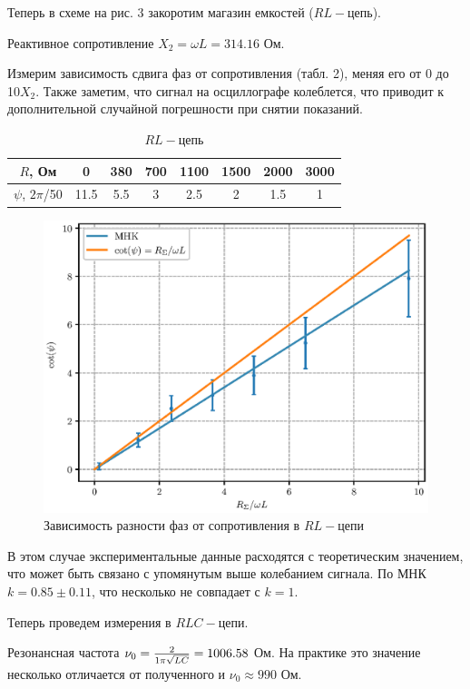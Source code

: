 \documentclass[12pt,a4paper]{article}
\begin{document}
Теперь в схеме на рис. 3 закоротим магазин емкостей ($RL-$цепь).

Реактивное сопротивление $X_2 = \omega L = 314.16$ Ом.

Измерим зависимость сдвига фаз от сопротивления (табл. 2), меняя его от 0 до 10$X_2$.
Также заметим, что сигнал на осциллографе колеблется, что приводит к дополнительной случайной погрешности при снятии показаний.

\begin{table}[H]
    \centering
    \begin{tabular}{|c|c|c|c|c|c|c|c|}
        \hline
        $R$, Ом &0&380&700&1100&1500&2000&3000\\
        \hline
        $\psi$, $2\pi$/50 &11.5&5.5&3&2.5&2&1.5&1\\
        \hline
    \end{tabular}
    \caption{$RL - $цепь}
\end{table}

\begin{figure}[H]
    \centering
    \includegraphics[width=0.6\linewidth]{pics/RL.eps}
    \caption{Зависимость разности фаз от сопротивления в $RL-$цепи}
\end{figure}

В этом случае экспериментальные данные расходятся с теоретическим значением, что может быть связано с упомянутым выше колебанием сигнала.
По МНК $k = 0.85 \pm 0.11$, что несколько не совпадает с $k = 1$.
\newline

Теперь проведем измерения в $RLC-$цепи.

Резонансная частота $\nu_0 = {2\over 1\pi \sqrt{LC}} = 1006.58$ Ом.
На практике это значение несколько отличается от полученного и $\nu_0 \approx 990$ Ом.
\end{document}
